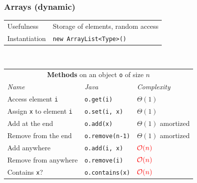 \documentclass[8pt,aspectratio=169]{beamer}
\begin{document}
\begin{frame}
\frametitle{Arrays (dynamic)}
\centering
\begin{tabular}{ll}
	Usefulness & Storage of elements, random access\\
	Instantiation & \texttt{new ArrayList<Type>()}\\
\end{tabular}\\
\vspace{0.5cm}
\centering
\begin{tabular}{lll}
	\multicolumn{3}{c}{\textbf{Methods} on an object \texttt{o} of size $n$} \\
	\textit{Name} & \textit{Java} & \textit{Complexity} \\
	Access element \texttt{i} & \texttt{o.get(i)} & $\Theta(1)$\\
	Assign \texttt{x} to element \texttt{i} & \texttt{o.set(i, x)} & $\Theta(1)$\\
	Add at the end & \texttt{o.add(x)} & $\Theta(1)$ \color{orange}amortized\\
	Remove from the end & \texttt{o.remove(n-1)} & $\Theta(1)$ \color{orange}amortized\\
	Add anywhere & \texttt{o.add(i, x)} & $\color{red}\mathcal{O}(n)$\\
	Remove from anywhere & \texttt{o.remove(i)} & $\color{red}\mathcal{O}(n)$\\
	Contains \texttt{x}? & \texttt{o.contains(x)} & $\color{red}\mathcal{O}(n)$\\
\end{tabular}
\end{frame}
\end{document}
